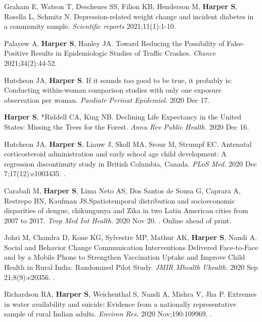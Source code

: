 \documentclass[
  letterpaper,
  DIV=11,
  numbers=noendperiod]{scrartcl}
\begin{document}
\begin{etaremune}
\item Graham E, Watson T, Deschenes SS, Filion KB, Henderson M, \textbf{Harper S}, Rosella L, Schmitz N. Depression-related weight change and incident diabetes in a community sample. \emph{Scientific reports} 2021;11(1):1-10.

\item Palayew A, \textbf{Harper S}, Hanley JA. Toward Reducing the Possibility of False-Positive Results in Epidemiologic Studies of Traffic Crashes. \emph{Chance} 2021;34(2):44-52.

\item Hutcheon JA, \textbf{Harper S}. If it sounds too good to be true, it probably is: Conducting within-woman comparison studies with only one exposure observation per woman. \emph{Paediatr Perinat Epidemiol.} 2020 Dec 17. 

\item \textbf{Harper S}, *Riddell CA, King NB. Declining Life Expectancy in the United States: Missing the Trees for the Forest. \emph{Annu Rev Public Health.} 2020 Dec 16. 

\item Hutcheon JA, \textbf{Harper S}, Liauw J, Skoll MA, Srour M, Strumpf EC. Antenatal corticosteroid administration and early school age child development: A regression discontinuity study in British Columbia, Canada. \emph{PLoS Med.} 2020 Dec 7;17(12):e1003435. .

\item Carabali M, \textbf{Harper S}, Lima Neto AS, Dos Santos de Sousa G, Caprara A, Restrepo BN, Kaufman JS.Spatiotemporal distribution and socioeconomic disparities of dengue, chikungunya and Zika in two Latin American cities from 2007 to 2017. \emph{Trop Med Int Health.} 2020 Nov 20. . Online ahead of print.

\item Johri M, Chandra D, Kone KG, Sylvestre MP, Mathur AK, \textbf{Harper S}, Nandi A. Social and Behavior Change Communication Interventions Delivered Face-to-Face and by a Mobile Phone to Strengthen Vaccination Uptake and Improve Child Health in Rural India: Randomized Pilot Study. \emph{JMIR Mhealth Uhealth.} 2020 Sep 21;8(9):e20356. .

\item *Richardson RA, \textbf{Harper S}, Weichenthal S, Nandi A, Mishra V, Jha P. Extremes in water availability and suicide: Evidence from a nationally representative sample of rural Indian adults. \emph{Environ Res.} 2020 Nov;190:109969. . 


\end{etaremune}
\end{document}
